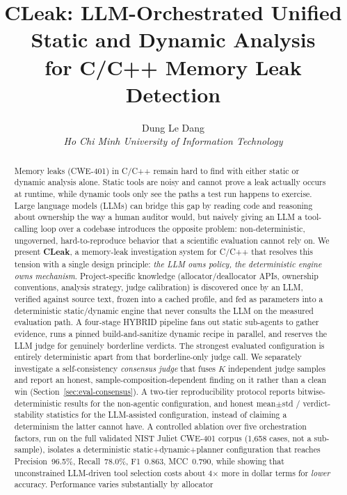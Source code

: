 \documentclass[11pt,a4paper]{article}
\title{CLeak: LLM-Orchestrated Unified Static and Dynamic Analysis\\
for C/C++ Memory Leak Detection}
\author{Dung Le Dang \\
\textit{Ho Chi Minh University of Information Technology}}
\date{}
\begin{document}
\maketitle

\begin{abstract}
Memory leaks (CWE-401) in C/C++ remain hard to find with either static or
dynamic analysis alone. Static tools are noisy and cannot prove a leak
actually occurs at runtime, while dynamic tools only see the paths a test
run happens to exercise. Large language models (LLMs) can bridge this gap by
reading code and reasoning about ownership the way a human auditor would,
but naively giving an LLM a tool-calling loop over a codebase introduces the
opposite problem: non-deterministic, ungoverned, hard-to-reproduce
behavior that a scientific evaluation cannot rely on. We present
\textbf{CLeak}, a memory-leak investigation system for C/C++ that resolves
this tension with a single design principle: \emph{the LLM owns policy, the
deterministic engine owns mechanism}. Project-specific knowledge
(allocator/deallocator APIs, ownership conventions, analysis strategy,
judge calibration) is discovered once by an LLM, verified against source
text, frozen into a cached profile, and fed as parameters into a
deterministic static/dynamic engine that never consults the LLM on the
measured evaluation path. A four-stage HYBRID pipeline fans out static
sub-agents to gather evidence, runs a pinned build-and-sanitize dynamic
recipe in parallel, and reserves the LLM judge for genuinely borderline
verdicts. The strongest evaluated configuration is entirely deterministic
apart from that borderline-only judge call. We separately investigate a
self-consistency \emph{consensus judge} that fuses $K$ independent judge
samples and report an honest, sample-composition-dependent finding on it
rather than a clean win (Section~\ref{sec:eval-consensus}). A
two-tier reproducibility protocol reports bitwise-deterministic results for
the non-agentic configuration, and honest mean$\pm$std / verdict-stability
statistics for the LLM-assisted configuration, instead of claiming a
determinism the latter cannot have. A controlled ablation over five
orchestration factors, run on the full validated NIST Juliet CWE-401
corpus (1{,}658 cases, not a sub-sample), isolates a deterministic
static+dynamic+planner configuration that reaches Precision~96.5\%,
Recall~78.0\%, F1~0.863, MCC~0.790, while showing that unconstrained
LLM-driven tool selection costs about 4$\times$ more in dollar terms
for \emph{lower} accuracy. Performance varies substantially by allocator

\end{abstract}
\end{document}
